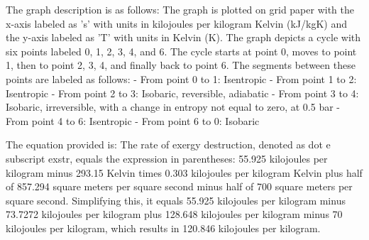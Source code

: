 The graph description is as follows: The graph is plotted on grid paper with the x-axis labeled as 's' with units in kilojoules per kilogram Kelvin (kJ/kgK) and the y-axis labeled as 'T' with units in Kelvin (K). The graph depicts a cycle with six points labeled 0, 1, 2, 3, 4, and 6. The cycle starts at point 0, moves to point 1, then to point 2, 3, 4, and finally back to point 6. The segments between these points are labeled as follows:
- From point 0 to 1: Isentropic
- From point 1 to 2: Isentropic
- From point 2 to 3: Isobaric, reversible, adiabatic
- From point 3 to 4: Isobaric, irreversible, with a change in entropy not equal to zero, at 0.5 bar
- From point 4 to 6: Isentropic
- From point 6 to 0: Isobaric

The equation provided is:
The rate of exergy destruction, denoted as dot e subscript exstr, equals the expression in parentheses: 55.925 kilojoules per kilogram minus 293.15 Kelvin times 0.303 kilojoules per kilogram Kelvin plus half of 857.294 square meters per square second minus half of 700 square meters per square second. Simplifying this, it equals 55.925 kilojoules per kilogram minus 73.7272 kilojoules per kilogram plus 128.648 kilojoules per kilogram minus 70 kilojoules per kilogram, which results in 120.846 kilojoules per kilogram.